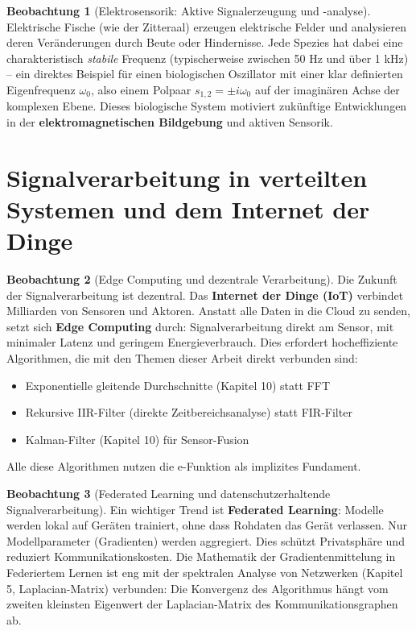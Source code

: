 ﻿\documentclass[a4paper,12pt]{report}
\theoremstyle{definition}
\newtheorem{beobachtung}{Beobachtung}
\begin{document}
	\begin{beobachtung}[Elektrosensorik: Aktive Signalerzeugung und -analyse]
		Elektrische Fische (wie der Zitteraal) erzeugen elektrische Felder und analysieren deren Veränderungen durch Beute oder Hindernisse. Jede Spezies hat dabei eine charakteristisch \emph{stabile} Frequenz (typischerweise zwischen 50 Hz und über 1 kHz) -- ein direktes Beispiel für einen biologischen Oszillator mit einer klar definierten Eigenfrequenz $\omega_0$, also einem Polpaar $s_{1,2} = \pm i\omega_0$ auf der imaginären Achse der komplexen Ebene. Dieses biologische System motiviert zukünftige Entwicklungen in der \textbf{elektromagnetischen Bildgebung} und aktiven Sensorik.
	\end{beobachtung}
	
	\section{Signalverarbeitung in verteilten Systemen und dem Internet der Dinge}
	
	\begin{beobachtung}[Edge Computing und dezentrale Verarbeitung]
		Die Zukunft der Signalverarbeitung ist dezentral. Das \textbf{Internet der Dinge (IoT)} verbindet Milliarden von Sensoren und Aktoren. Anstatt alle Daten in die Cloud zu senden, setzt sich \textbf{Edge Computing} durch: Signalverarbeitung direkt am Sensor, mit minimaler Latenz und geringem Energieverbrauch. Dies erfordert hocheffiziente Algorithmen, die mit den Themen dieser Arbeit direkt verbunden sind:
		\begin{itemize}
			\item[-] Exponentielle gleitende Durchschnitte (Kapitel 10) statt FFT
			\item[-] Rekursive IIR-Filter (direkte Zeitbereichsanalyse) statt FIR-Filter
			\item[-] Kalman-Filter (Kapitel 10) für Sensor-Fusion
		\end{itemize}
		Alle diese Algorithmen nutzen die e-Funktion als implizites Fundament.
	\end{beobachtung}
	
	\begin{beobachtung}[Federated Learning und datenschutzerhaltende Signalverarbeitung]
		Ein wichtiger Trend ist \textbf{Federated Learning}: Modelle werden lokal auf Geräten trainiert, ohne dass Rohdaten das Gerät verlassen. Nur Modellparameter (Gradienten) werden aggregiert. Dies schützt Privatsphäre und reduziert Kommunikationskosten. Die Mathematik der Gradientenmittelung in Federiertem Lernen ist eng mit der spektralen Analyse von Netzwerken (Kapitel 5, Laplacian-Matrix) verbunden: Die Konvergenz des Algorithmus hängt vom zweiten kleinsten Eigenwert der Laplacian-Matrix des Kommunikationsgraphen ab.
	\end{beobachtung}
	
\end{document}

